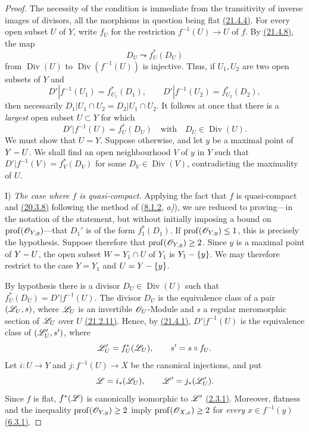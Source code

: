 \begin{proof}
The necessity of the condition is immediate from the transitivity of
inverse images of divisors, all the morphisms in question being flat
{\hyperref[IV.21.4.4]{(21.4.4)}}.  For every open subset $U$ of $Y$, write $f_U$ for the
restriction $f^{-1}(U)\to U$ of $f$.  By {\hyperref[IV.21.4.8]{(21.4.8)}}, the map
\[
 D_U\leadsto f_U^*(D_U)
\]
from $\operatorname{Div}(U)$ to
$\operatorname{Div}(f^{-1}(U))$ is injective.  Thus, if $U_1,U_2$ are
two open subsets of $Y$ and
\[
 D'|f^{-1}(U_1)=f_{U_1}^*(D_1),\qquad
 D'|f^{-1}(U_2)=f_{U_2}^*(D_2),
\]
then necessarily
$D_1|U_1\cap U_2=D_2|U_1\cap U_2$.  It follows at once that there is a
\emph{largest} open subset $U\subset Y$ for which
\[
 D'|f^{-1}(U)=f_U^*(D_U)
 \quad\text{with}\quad D_U\in\operatorname{Div}(U).
\]
We must show that $U=Y$.  Suppose otherwise, and let $y$ be a maximal
point of $Y- U$.  We shall find an open neighbourhood $V$ of
$y$ in $Y$ such that
$D'|f^{-1}(V)=f_V^*(D_V)$ for some
$D_V\in\operatorname{Div}(V)$, contradicting the maximality of $U$.

\textup{I)} \emph{The case where $f$ is quasi-compact.}
Applying the fact that $f$ is quasi-compact and {\hyperref[IV.20.3.8]{(20.3.8)}} following the method of
({\hyperref[IV.8.1.2]{8.1.2}}, \emph{a)}), we are reduced to proving---in the notation of the
statement, but without initially imposing a bound on
$\operatorname{prof}(\mathscr{O}_{Y,y})$---that $D_1'$ is of the form
$f_1^*(D_1)$.  If $\operatorname{prof}(\mathscr{O}_{Y,y})\leq 1$, this is
precisely the hypothesis.  Suppose therefore that
$\operatorname{prof}(\mathscr{O}_{Y,y})\geq 2$.  Since $y$ is a maximal
point of $Y- U$, the open subset $W=Y_1\cap U$ of $Y_1$ is
$Y_1-\{y\}$.  We may therefore restrict to the case
$Y=Y_1$ and $U=Y-\{y\}$.

By hypothesis there is a divisor $D_U\in\operatorname{Div}(U)$ such
that $f_U^*(D_U)=D'|f^{-1}(U)$.  The divisor $D_U$ is the equivalence
class of a pair $(\mathscr{L}_U,s)$, where $\mathscr{L}_U$ is an invertible
$\mathscr{O}_U$-Module and $s$ a regular meromorphic section of $\mathscr{L}_U$
over $U$ {\hyperref[IV.21.2.11]{(21.2.11)}}.  Hence, by {\hyperref[IV.21.4.1]{(21.4.1)}}, $D'|f^{-1}(U)$ is the
equivalence class of $(\mathscr{L}'_U,s')$, where
\[
 \mathscr{L}'_U=f_U^*(\mathscr{L}_U),\qquad s'=s\circ f_U.
\]
Let $i:U\to Y$ and $j:f^{-1}(U)\to X$ be the canonical injections,
and put
\[
 \mathscr{L}=i_*(\mathscr{L}_U),\qquad
 \mathscr{L}'=j_*(\mathscr{L}'_U).
\]
Since $f$ is flat, $f^*(\mathscr{L})$ is canonically isomorphic to
$\mathscr{L}'$ {\hyperref[IV.2.3.1]{(2.3.1)}}.  Moreover, flatness and the inequality
$\operatorname{prof}(\mathscr{O}_{Y,y})\geq 2$ imply
$\operatorname{prof}(\mathscr{O}_{X,x})\geq 2$ for \emph{every}
$x\in f^{-1}(y)$ {\hyperref[IV.6.3.1]{(6.3.1)}}.


\end{proof}
